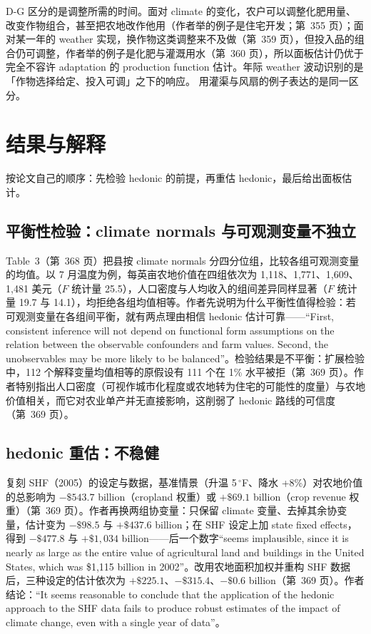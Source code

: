 \begin{intuition}
D-G 区分的是调整所需的时间。面对 climate 的变化，农户可以调整化肥用量、改变作物组合，甚至把农地改作他用（作者举的例子是住宅开发；第~355 页）；面对某一年的 weather 实现，换作物这类调整来不及做（第~359 页），但投入品的组合仍可调整，作者举的例子是化肥与灌溉用水（第~360 页），所以面板估计仍优于完全不容许 adaptation 的 production function 估计。年际 weather 波动识别的是「作物选择给定、投入可调」之下的响应。 用灌渠与风扇的例子表达的是同一区分。
\end{intuition}

\section{结果与解释}

按论文自己的顺序：先检验 hedonic 的前提，再重估 hedonic，最后给出面板估计。

\subsection{平衡性检验：climate normals 与可观测变量不独立}

Table~3（第~368 页）把县按 climate normals 分四分位组，比较各组可观测变量的均值。以 7 月温度为例，每英亩农地价值在四组依次为 1{,}118、1{,}771、1{,}609、1{,}481 美元（$F$ 统计量 25.5），人口密度与人均收入的组间差异同样显著（$F$ 统计量 19.7 与 14.1），均拒绝各组均值相等。作者先说明为什么平衡性值得检验：若可观测变量在各组间平衡，就有两点理由相信 hedonic 估计可靠——``First, consistent inference will not depend on functional form assumptions on the relation between the observable confounders and farm values. Second, the unobservables may be more likely to be balanced''\citep[第~368 页]{deschenes2007economic}。检验结果是不平衡：扩展检验中，112 个解释变量均值相等的原假设有 111 个在 1\% 水平被拒（第~369 页）。作者特别指出人口密度（可视作城市化程度或农地转为住宅的可能性的度量）与农地价值相关，而它对农业单产并无直接影响，这削弱了 hedonic 路线的可信度（第~369 页）。

\subsection{hedonic 重估：不稳健}

复刻 SHF（2005）的设定与数据，基准情景（升温 5\,$^\circ$F、降水 +8\%）对农地价值的总影响为 $-\$543.7$ billion（cropland 权重）或 $+\$69.1$ billion（crop revenue 权重）（第~369 页）。作者再换两组协变量：只保留 climate 变量、去掉其余协变量，估计变为 $-\$98.5$ 与 $+\$437.6$ billion；在 SHF 设定上加 state fixed effects，得到 $-\$477.8$ 与 $+\$1{,}034$ billion——后一个数字``seems implausible, since it is nearly as large as the entire value of agricultural land and buildings in the United States, which was \$1,115 billion in 2002''\citep[第~369 页]{deschenes2007economic}。改用农地面积加权并重构 SHF 数据后，三种设定的估计依次为 $+\$225.1$、$-\$315.4$、$-\$0.6$ billion（第~369 页）。作者结论：``It seems reasonable to conclude that the application of the hedonic approach to the SHF data fails to produce robust estimates of the impact of climate change, even with a single year of data''\citep[第~369 页]{deschenes2007economic}。

